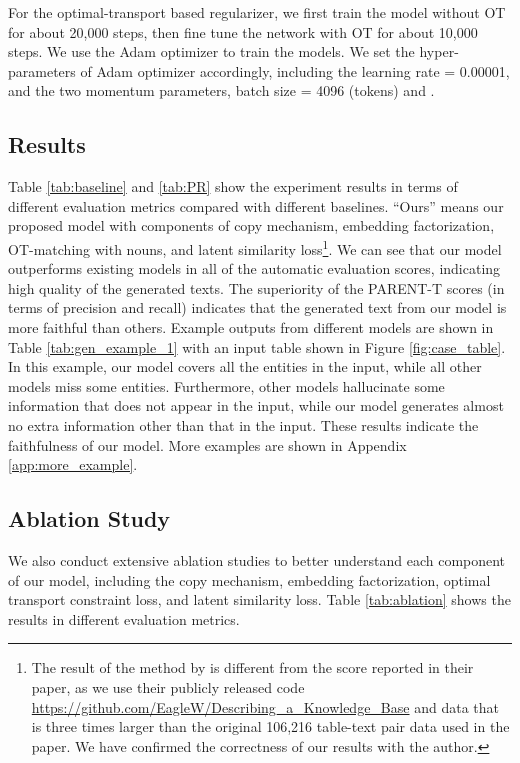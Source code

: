 \documentclass[11pt,a4paper]{article}
\newcommand{\quotes}[1]{``#1''}
\begin{document}
For the optimal-transport based regularizer, we first train the model without OT for about 20,000 steps, then fine tune the network with OT for about 10,000 steps. 
We use the Adam \cite{Kingma2015}
optimizer to train the models. We set the hyper-parameters of Adam optimizer accordingly, including the learning rate  = 0.00001, and the two momentum parameters, batch size = 4096 (tokens) and .




\subsection{Results}
Table \ref{tab:baseline} and \ref{tab:PR} show the experiment results in terms of different evaluation metrics compared with different baselines. \quotes{Ours} means our proposed model with components of copy mechanism, embedding factorization, OT-matching with nouns, and latent similarity loss\footnote{The result of the method by \cite{Wang2018} is different from the score reported in their paper, as we use their publicly released code \href{url}{https://github.com/EagleW/Describing\_a\_Knowledge\_Base} and data that is three times larger than the original 106,216 table-text pair data used in the paper. We have confirmed the correctness of our results with the author.}. We can see that our model outperforms existing models in all of the automatic evaluation scores, indicating high quality of the generated texts. The superiority of the PARENT-T scores (in terms of precision and recall) indicates that the generated text from our model is more faithful than others. Example outputs from different models are shown in Table \ref{tab:gen_example_1} with an input table shown in Figure \ref{fig:case_table}. In this example, our model covers all the entities in the input, while all other models miss some entities. Furthermore, other models hallucinate some information that does not appear in the input, while our model generates almost no extra information other than that in the input. These results indicate the faithfulness of our model. More examples are shown in Appendix \ref{app:more_example}.


\subsection{Ablation Study}

We also conduct extensive ablation studies to better understand each component of our model, including the copy mechanism, embedding factorization, optimal transport constraint loss, and latent similarity loss. Table \ref{tab:ablation} shows the results in different evaluation metrics.
\end{document}
